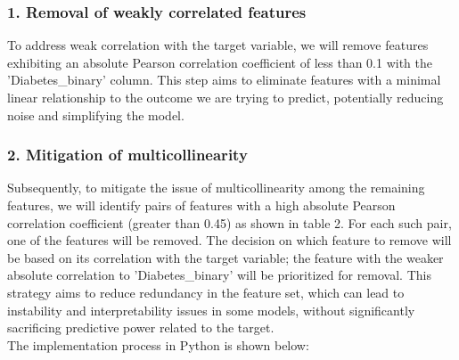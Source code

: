 \subsubsection*{1. Removal of weakly correlated features}
To address weak correlation with the target variable, we will remove features exhibiting an absolute Pearson correlation coefficient of less than 0.1 with the 'Diabetes\_binary' column. This step aims to eliminate features with a minimal linear relationship to the outcome we are trying to predict, potentially reducing noise and simplifying the model.


\subsubsection*{2. Mitigation of multicollinearity}
Subsequently, to mitigate the issue of multicollinearity among the remaining features, we will identify pairs of features with a high absolute Pearson correlation coefficient (greater than 0.45) as shown in table 2. For each such pair, one of the features will be removed. The decision on which feature to remove will be based on its correlation with the target variable; the feature with the weaker absolute correlation to 'Diabetes\_binary' will be prioritized for removal. This strategy aims to reduce redundancy in the feature set, which can lead to instability and interpretability issues in some models, without significantly sacrificing predictive power related to the target.
\\
\newline
The implementation process in Python is shown below:
\\





